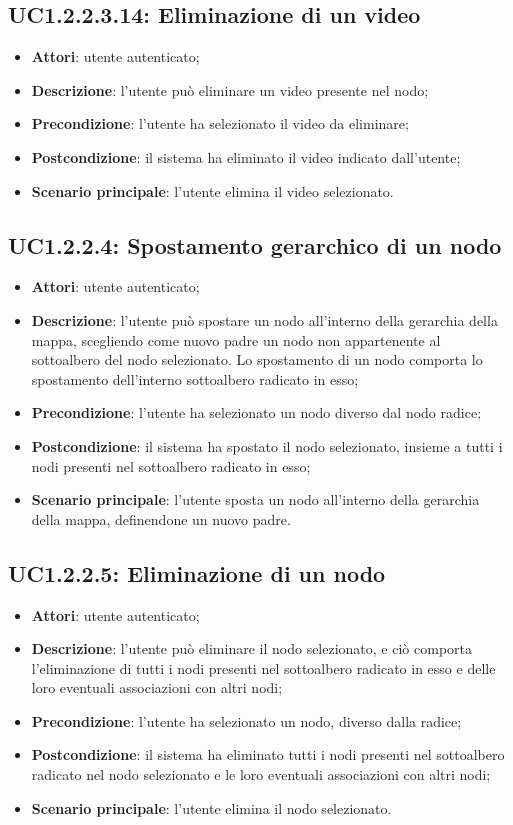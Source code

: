 \subsection{UC1.2.2.3.14: Eliminazione di un video}
\label{UC1.2.2.3.14}
\begin{itemize}
\item \textbf{Attori}: utente autenticato;
\item \textbf{Descrizione}: l'utente può eliminare un video presente nel nodo;
\item \textbf{Precondizione}: l'utente ha selezionato il video da eliminare;
\item \textbf{Postcondizione}: il sistema ha eliminato il video indicato dall'utente;
\item \textbf{Scenario principale}:
l'utente elimina il video selezionato.
\end{itemize}
\subsection{UC1.2.2.4: Spostamento gerarchico di un nodo}
\label{UC1.2.2.4}
\begin{itemize}
\item \textbf{Attori}: utente autenticato;
\item \textbf{Descrizione}: l'utente può spostare un nodo all'interno della gerarchia della mappa, scegliendo come nuovo padre un nodo non appartenente al sottoalbero del nodo selezionato. Lo spostamento di un nodo comporta lo spostamento dell'interno sottoalbero radicato in esso;
\item \textbf{Precondizione}: l'utente ha selezionato un nodo diverso dal nodo radice;
\item \textbf{Postcondizione}: il sistema ha spostato il nodo selezionato, insieme a tutti i nodi presenti nel sottoalbero radicato in esso;
\item \textbf{Scenario principale}:
l'utente sposta un nodo all'interno della gerarchia della mappa, definendone un nuovo padre.
\end{itemize}
\subsection{UC1.2.2.5: Eliminazione di un nodo}
\label{UC1.2.2.5}
\begin{itemize}
\item \textbf{Attori}: utente autenticato;
\item \textbf{Descrizione}: l'utente può eliminare il nodo selezionato, e ciò comporta l'eliminazione di tutti i nodi presenti nel sottoalbero radicato in esso e delle loro eventuali associazioni con altri nodi;
\item \textbf{Precondizione}: l'utente ha selezionato un nodo, diverso dalla radice;
\item \textbf{Postcondizione}: il sistema ha eliminato tutti i nodi presenti nel sottoalbero radicato nel nodo selezionato e le loro eventuali associazioni con altri nodi;
\item \textbf{Scenario principale}:
l'utente elimina il nodo selezionato.
\end{itemize}

